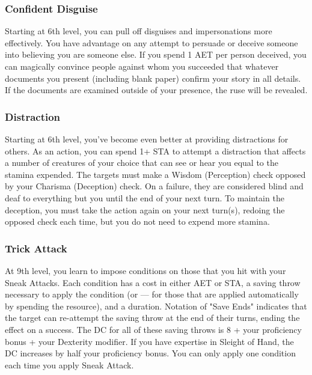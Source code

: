 \subsubsection{Confident Disguise}
Starting at 6th level, you can pull off disguises and impersonations more effectively. You have advantage on any attempt to persuade or deceive someone into believing you are someone else. If you spend 1 AET per person deceived, you can magically convince people against whom you succeeded that whatever documents you present (including blank paper) confirm your story in all details. If the documents are examined outside of your presence, the ruse will be revealed.

\subsubsection{Distraction}
Starting at 6th level, you've become even better at providing distractions for others. As an action, you can spend 1+ STA to attempt a distraction that affects a number of creatures of your choice that can see or hear you equal to the stamina expended. The targets must make a Wisdom (Perception) check opposed by your Charisma (Deception) check. On a failure, they are considered blind and deaf to everything but you until the end of your next turn. To maintain the deception, you must take the action again on your next turn(s), redoing the opposed check each time, but you do not need to expend more stamina.

\subsubsection{Trick Attack}
At 9th level, you learn to impose conditions on those that you hit with your Sneak Attacks. Each condition has a cost in either AET or STA, a saving throw necessary to apply the condition (or --- for those that are applied automatically by spending the resource), and a duration. Notation of "Save Ends" indicates that the target can re-attempt the saving throw at the end of their turns, ending the effect on a success. The DC for all of these saving throws is 8 + your proficiency bonus + your Dexterity modifier. If you have expertise in Sleight of Hand, the DC increases by half your proficiency bonus. You can only apply one condition each time you apply Sneak Attack.

